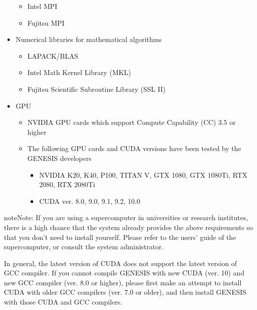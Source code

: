 \documentclass[a4paper,11pt,oneside,english]{sphinxmanual}
\begin{document}
\begin{itemize}
\begin{itemize}
\item {} 
Intel MPI

\item {} 
Fujitsu MPI

\end{itemize}

\item {} 
Numerical libraries for mathematical algorithms
\begin{itemize}
\item {} 
LAPACK/BLAS

\item {} 
Intel Math Kernel Library (MKL)

\item {} 
Fujitsu Scientific Subroutine Library (SSL II)

\end{itemize}

\item {} 
GPU 
\begin{itemize}
\item {} 
NVIDIA GPU cards which support Compute Capability (CC) 3.5 or higher

\item {} 
The following GPU cards and CUDA versions have been tested by the GENESIS developers
\begin{itemize}
\item {} 
NVIDIA K20, K40, P100, TITAN V, GTX 1080, GTX 1080Ti, RTX 2080, RTX 2080Ti

\item {} 
CUDA ver. 8.0, 9.0, 9.1, 9.2, 10.0

\end{itemize}

\end{itemize}

\end{itemize}

\begin{sphinxadmonition}{note}{Note:}
If you are using a supercomputer in universities or research institutes,
there is a high chance that the system already provides the above requirements so
that you don’t need to install yourself.
Please refer to the users’ guide of the supercomputer, or consult the system administrator.

In general, the latest version of CUDA does not support the latest version of GCC compiler.
If you cannot compile GENESIS with new CUDA (ver. 10) and new GCC compiler (ver. 8.0 or higher),
please first make an attempt to install CUDA with older GCC compilers (ver. 7.0 or older),
and then install GENESIS with those CUDA and GCC compilers.
\end{sphinxadmonition}
\end{document}

